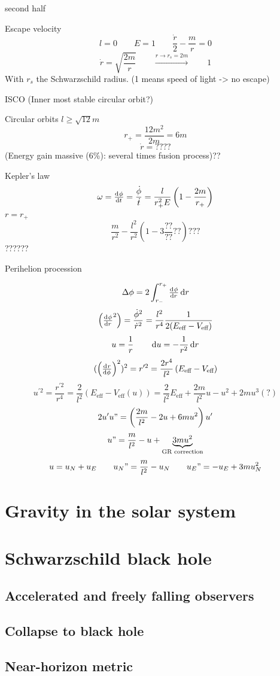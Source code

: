 second half

Escape velocity
\[ l=0 \qquad E=1 \qquad \frac{\dot{r}}{2} - \frac{m}{r} = 0 \]
\[ \dot{r} = \sqrt{\frac{2m}{r}} \qquad \overset{r\to r_s = 2m}{\to} \qquad 1 \]
With $r_s$ the Schwarzschild radius. (1 means speed of light -> no escape)

ISCO (Inner most stable circular orbit?)

Circular orbits $l \geq \sqrt{12}m$
\[ r_+ = \frac{12m^2}{2m} = 6m \]
\[ \dot{r} = ???? \]
(Energy gain massive (6\%): several times fusion process)??

Kepler's law
\[ \omega = \od{\phi}{t} = \frac{\dot{\phi}}{\dot{t}} = \frac{l}{r_+^2E}\left(1- \frac{2m}{r_+}\right) \]
$r=r_+$
\[ \frac{m}{r^2}- \frac{l^2}{r^2}\left(1-3 \frac{??}{??}??\right)??? \]
??????

Perihelion procession

\[\Delta \phi = 2\int^{r_+}_{r_-} \od{\phi}{r}\diff{r}\]
\[ \left(\od{\phi}{r}^2\right)= \frac{\dot{\phi}^2}{\dot{r}^2} = \frac{l^2}{r^4}\frac{1}{2(E_\text{eff}-V_\text{eff})} \]
\[ u = \frac{1}{r} \qquad \operatorname{d \!}{u} = - \frac{1}{r^2}\operatorname{d \!}{r} \]
\[ (\left(\od{r}{\phi}\right)^2)^2 = r'^2 = \frac{2r^4}{l^2}\left(E_\text{eff}-V_\text{eff}\right) \]
\[ u^{\prime 2} = \frac{r^{\prime2}}{r^4} = \frac{2}{l^2}\left(E_\text{eff} - V_\text{eff}(u)\right) = \frac{2}{l^2}E_\text{eff} + \frac{2m}{l^2}u - u^2+2mu^3(?) \]
\[ 2u'u" = \left(\frac{2m}{l^2}-2u + 6mu^2\right)u' \]
\[ u" = \frac{m}{l^2} - u + \underbrace{3mu^2}_\text{GR correction} \]
\[ u=u_N + u_E \qquad u_N" = \frac{m}{l^2}-	u_N \qquad u_E"= -u_E + 3mu_N^2 \]

\chapter{Gravity in the solar system}

\chapter{Schwarzschild black hole}
\section{Accelerated and freely falling observers}
\section{Collapse to black hole}
\section{Near-horizon metric}

